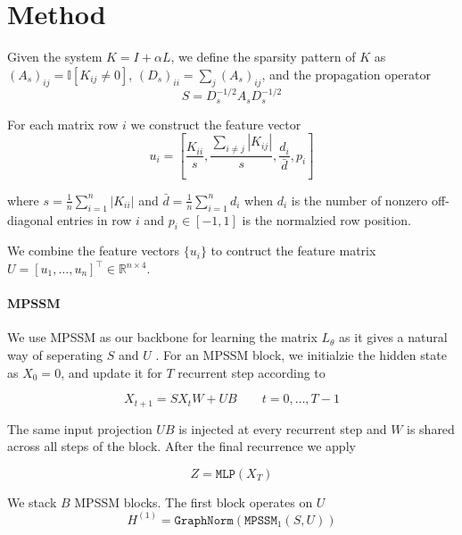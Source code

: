 \section{Method}
Given the system $K = I + \alpha L$, we define the sparsity pattern of $K$ as
$(A_s)_{ij} = \mathbb{I}[K_{ij} \neq 0]$, $(D_s)_{ii} = \sum_{j}(A_s)_{ij}$,
and the propagation operator
\begin{equation*}\label{eq:sparsity_pattern_matrix}
    S = D_s^{-1/2} A_s D_s^{-1/2}
\end{equation*}

For each matrix row $i$ we construct the feature vector
\begin{equation}\label{eq:system_feature_vec}
    u_i = \left[\frac{K_{ii}}{s}, \frac{\sum_{i \neq j}|K_{ij}|}{s}, \frac{d_i}{\bar d}, p_i\right]
\end{equation}

where $s = \frac{1}{n} \sum_{i = 1}^n |K_{ii}|$ and $\bar d = \frac{1}{n}\sum_{i = 1}^n
    d_i$ when $d_i$ is the number of nonzero off-diagonal entries in row $i$ and
$p_i\in [-1,1]$ is the normalzied row position.

We combine the feature vectors $\{u_i\}$ to contruct the feature matrix $U = [u_1,\dots,
            u_n]^\top \in \mathbb{R}^{n \times 4}$.


\paragraph{MPSSM} We use MPSSM \cite{ceniMessagePassingStateSpaceModels2025} as
our backbone for learning the matrix $L_\theta$ as it gives a natural way of
seperating $S$ and $U$ . For an MPSSM block, we initialzie the hidden state as
$X_0 = 0$, and update it for $T$ recurrent step according to

\begin{equation*}
    X_{t + 1} = SX_{t}W + UB \qquad t = 0,\dots,T-1
\end{equation*}

The same input projection $UB$ is injected at every recurrent step and $W$ is
shared across all steps of the block. After the final recurrence we apply

\begin{equation}
    Z = \texttt{MLP}(X_T)
\end{equation}

We stack $B$ MPSSM blocks. The first block operates on $U$
\begin{equation}
    H^{(1)} = \texttt{GraphNorm}(\texttt{MPSSM}_1(S,U))
\end{equation}


